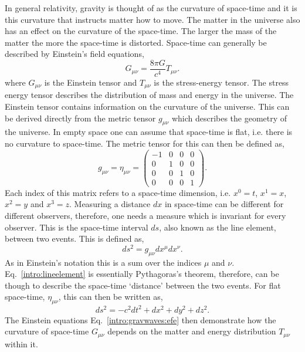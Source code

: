 In general relativity, gravity is thought of as the curvature of space-time and it is this curvature that instructs matter how to move. 
The matter in the universe also has an effect on the curvature of the space-time.
The larger the mass of the matter the more the space-time is distorted.
Space-time can generally be described by Einstein's field equations,
\begin{equation}
\label{intro:gravwaves:efe}
    G_{\mu \nu} = \frac{8 \pi G}{c^4}T_{\mu \nu}.
\end{equation}
where $G_{\mu \nu}$ is the Einstein tensor and $T_{\mu \nu}$ is the stress-energy tensor.
The stress energy tensor describes the distribution of mass and energy in the universe. 
The Einstein tensor contains information on the curvature of the universe. 
This can be derived directly from the metric tensor $g_{\mu \nu}$ which describes the geometry of the universe.
In empty space one can assume that space-time is flat, i.e. there is no curvature to space-time. The metric tensor for this can then be defined as,
\begin{equation}
g_{\mu \nu} = \eta_{\mu \nu} = \left(
\begin{matrix}
-1 & 0 & 0 & 0 \\
0 & 1 & 0 & 0 \\
0 & 0 & 1 & 0 \\
0 & 0 & 0 & 1 
\end{matrix}
\right).
\end{equation}
Each index of this matrix refers to a space-time dimension, i.e. $x^0 = t$, $x^1=x$, $x^2=y$ and $x^3=z$. 
Measuring a distance $dx$ in space-time can be different for different observers, therefore, one needs a measure which is invariant for every observer. 
This is the space-time interval $ds$, also known as the line element, between two events. 
This is defined as,
\begin{equation}
\label{intro:lineelement}
    ds^2 = g_{\mu \nu} dx^{\mu}dx^{\nu}.
\end{equation}
As in Einstein's notation this is a sum over the indices $\mu$ and $\nu$.  
Eq.~\ref{intro:lineelement} is essentially Pythagoras's theorem, therefore, can be though to describe the space-time `distance' between the two events.
For flat space-time, $\eta_{\mu\nu}$, this can then be written as,
\begin{equation}
    ds^2 = -c^2 dt^2 + dx^2 + dy^2 + dz^2.
\end{equation}
The Einstein equations Eq.~\ref{intro:gravwaves:efe} then demonstrate how the curvature of space-time $G_{\mu\nu}$ depends on the matter and energy distribution $T_{\mu \nu}$ within it.

